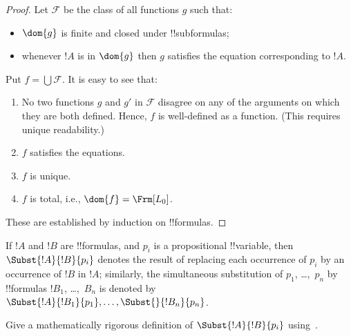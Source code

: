 \documentclass[../../../include/open-logic-section]{subfiles}
\begin{document}
\begin{proof}
Let $\mathcal{F}$ be the class of all functions $g$ such that:
\begin{itemize}
\item $\dom{g}$ is finite and closed under !!{subformula}s;
\item whenever $!A$ is in $\dom{g}$ then $g$ satisfies the
    equation corresponding to $!A$.
\end{itemize}
Put $f = \bigcup \mathcal{F}$. It is easy to see that: 
\begin{enumerate}
\item No two functions $g$ and $g'$ in $\mathcal{F}$ disagree on any
  of the arguments on which they are both defined. Hence, $f$ is
  well-defined as a function. (This requires unique readability.)
\item $f$ satisfies the equations.
\item $f$ is unique.
\item $f$ is total, i.e., $\dom{f} = \Frm[L_0]$.
\end{enumerate}
These are established by induction on !!{formula}s.
\end{proof}

\begin{defn} 
If $!A$ and $!B$ are !!{formula}s, and $p_i$ is a propositional
!!{variable}, then $\Subst{!A}{!B}{p_i}$ denotes the result of
replacing each occurrence of $p_i$ by an occurrence of $!B$ in $!A$;
similarly, the simultaneous substitution of $p_1$, \dots,~$p_n$ by
!!{formula}s $!B_1$, \dots,~$\!B_n$ is denoted by
$\Subst{!A}{!B_1}{p_1},\ldots, \Subst{}{!B_n}{p_n}$.
\end{defn}

\begin{prob}
Give a mathematically rigorous definition of $\Subst{!A}{!B}{p_i}$
using~.
\end{prob}
\end{document}
